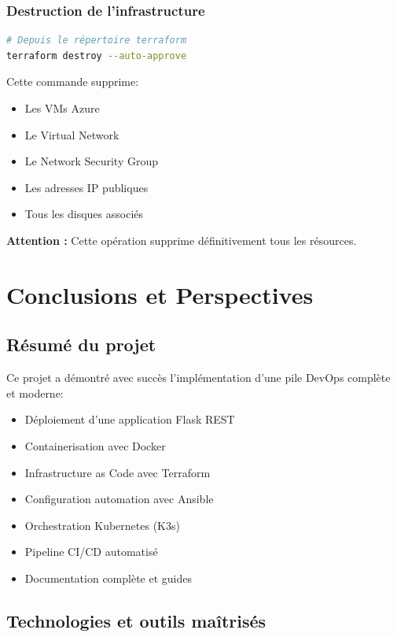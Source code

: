 \documentclass[12pt,a4paper,twoside]{report}
\begin{document}
\subsection{Destruction de l'infrastructure}

\begin{lstlisting}[language=bash]
# Depuis le répertoire terraform
terraform destroy --auto-approve
\end{lstlisting}

Cette commande supprime:
\begin{itemize}
    \item Les VMs Azure
    \item Le Virtual Network
    \item Le Network Security Group
    \item Les adresses IP publiques
    \item Tous les disques associés
\end{itemize}

\textbf{Attention :} Cette opération supprime définitivement tous les résources.

\newpage

\chapter{Conclusions et Perspectives}

\section{Résumé du projet}

Ce projet a démontré avec succès l'implémentation d'une pile DevOps complète et moderne:

\begin{itemize}
    \item Déploiement d'une application Flask REST
    \item Containerisation avec Docker
    \item Infrastructure as Code avec Terraform
    \item Configuration automation avec Ansible
    \item Orchestration Kubernetes (K3s)
    \item Pipeline CI/CD automatisé
    \item Documentation complète et guides
\end{itemize}

\section{Technologies et outils maîtrisés}
\end{document}
